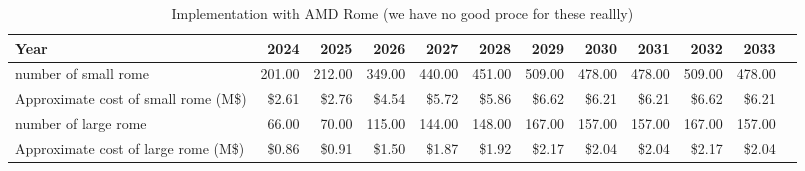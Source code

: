 \tiny \begin{longtable} { |p{}  |r  |r  |r  |r  |r  |r  |r  |r  |r  |r  |r |} 
\caption{Implementation with AMD Rome (we have no good proce for these reallly) \label{tab:opsRome}}\\ 
\hline 
\textbf{Year}&\textbf{2024}&\textbf{2025}&\textbf{2026}&\textbf{2027}&\textbf{2028}&\textbf{2029}&\textbf{2030}&\textbf{2031}&\textbf{2032}&\textbf{2033} \\ \hline
{number of small rome }&{201.00}&{212.00}&{349.00}&{440.00}&{451.00}&{509.00}&{478.00}&{478.00}&{509.00}&{478.00} \\ \hline
{Approximate cost of small rome (M\$)}&{\$2.61}&{\$2.76}&{\$4.54}&{\$5.72}&{\$5.86}&{\$6.62}&{\$6.21}&{\$6.21}&{\$6.62}&{\$6.21} \\ \hline
{number of large rome }&{66.00}&{70.00}&{115.00}&{144.00}&{148.00}&{167.00}&{157.00}&{157.00}&{167.00}&{157.00} \\ \hline
{Approximate cost of large rome (M\$)}&{\$0.86}&{\$0.91}&{\$1.50}&{\$1.87}&{\$1.92}&{\$2.17}&{\$2.04}&{\$2.04}&{\$2.17}&{\$2.04} \\ \hline
\end{longtable} \normalsize
